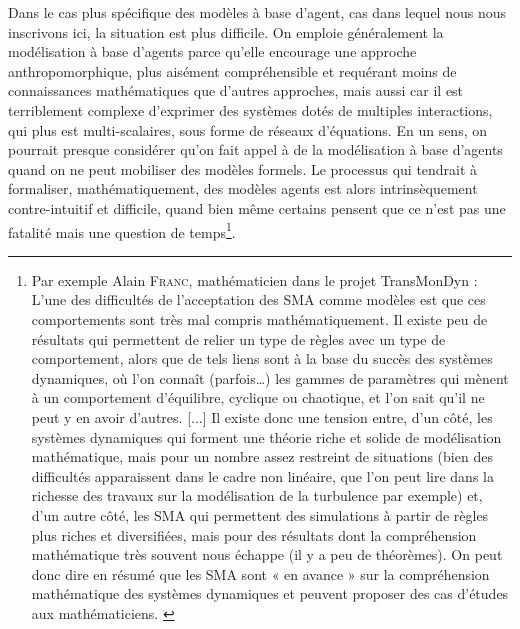 Dans le cas plus spécifique des modèles à base d'agent, cas dans lequel nous nous inscrivons ici, la situation est plus difficile.
On emploie généralement la modélisation à base d'agents parce qu'elle encourage une approche anthropomorphique, plus aisément compréhensible et requérant moins de connaissances mathématiques que d'autres approches, mais aussi car il est terriblement complexe d'exprimer des systèmes dotés de multiples interactions, qui plus est multi-scalaires, sous forme de réseaux d'équations.
En un sens, on pourrait presque considérer qu'on fait appel à de la modélisation à base d'agents quand on ne peut mobiliser des modèles formels.
Le processus qui tendrait à formaliser, mathématiquement, des modèles agents est alors intrinsèquement contre-intuitif et difficile, quand bien même certains pensent que ce n'est pas une fatalité mais une question de temps\footnote{
	Par exemple Alain \textsc{Franc}, mathématicien dans le projet TransMonDyn :
	\og L'une des difficultés de l'acceptation des SMA comme modèles est que ces comportements sont très mal compris mathématiquement.
	Il existe peu de résultats qui permettent de relier un type de règles avec un type de comportement, alors que de tels liens sont à la base du succès des systèmes dynamiques, où l'on connaît (parfois\ldots) les gammes de paramètres qui mènent à un comportement d'équilibre, cyclique ou chaotique, et l'on sait qu'il ne peut y en avoir d'autres.
	[...]
	Il existe donc une tension entre, d'un côté, les systèmes dynamiques qui forment une théorie riche et solide de modélisation mathématique, mais pour un nombre assez restreint de situations (bien des difficultés apparaissent dans le cadre non linéaire, que l'on peut lire dans la richesse des travaux sur la modélisation de la turbulence par exemple) et, d'un autre côté, les SMA qui permettent des simulations à partir de règles plus riches et diversifiées, mais pour des résultats dont la compréhension mathématique très souvent nous échappe (il y a peu de théorèmes).
	On peut donc dire en résumé que les SMA sont « en avance » sur la compréhension mathématique des systèmes dynamiques et peuvent proposer des cas d'études aux mathématiciens.\fg{}
	\autocite[Annexe 2, \og Retour sur les SMA comme outil et cadre conceptuel de modélisation.\fg{}, pp. 479-482 ]{ouriachi_lelaboration_2018}
}.


